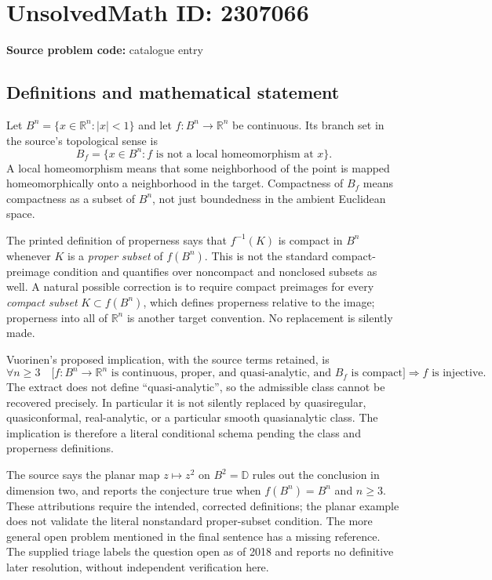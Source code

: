 \documentclass[11pt]{article}
\newcommand{\R}{\mathbb{R}}
\begin{document}
\section*{UnsolvedMath ID: 2307066}
\textbf{Source problem code:} catalogue entry
\subsection{Definitions and mathematical statement}
Let $B^n=\{x\in\R^n:|x|<1\}$ and let $f:B^n\to\R^n$ be continuous. Its branch set in the source's topological sense is
\[
B_f=\{x\in B^n:f\text{ is not a local homeomorphism at }x\}.
\]
A local homeomorphism means that some neighborhood of the point is mapped homeomorphically onto a neighborhood in the target. Compactness of $B_f$ means compactness as a subset of $B^n$, not just boundedness in the ambient Euclidean space.

The printed definition of properness says that $f^{-1}(K)$ is compact in $B^n$ whenever $K$ is a \emph{proper subset} of $f(B^n)$. This is not the standard compact-preimage condition and quantifies over noncompact and nonclosed subsets as well. A natural possible correction is to require compact preimages for every \emph{compact subset} $K\subset f(B^n)$, which defines properness relative to the image; properness into all of $\R^n$ is another target convention. No replacement is silently made.

Vuorinen's proposed implication, with the source terms retained, is
\[
\forall n\ge3\quad
\bigl[f:B^n\to\R^n\text{ is continuous, proper, and quasi-analytic, and }B_f\text{ is compact}\bigr]
\Longrightarrow f\text{ is injective}.
\]
The extract does not define ``quasi-analytic'', so the admissible class cannot be recovered precisely. In particular it is not silently replaced by quasiregular, quasiconformal, real-analytic, or a particular smooth quasianalytic class. The implication is therefore a literal conditional schema pending the class and properness definitions.

The source says the planar map $z\mapsto z^2$ on $B^2=\mathbb D$ rules out the conclusion in dimension two, and reports the conjecture true when $f(B^n)=B^n$ and $n\ge3$. These attributions require the intended, corrected definitions; the planar example does not validate the literal nonstandard proper-subset condition. The more general open problem mentioned in the final sentence has a missing reference. The supplied triage labels the question open as of 2018 and reports no definitive later resolution, without independent verification here.
\end{document}
